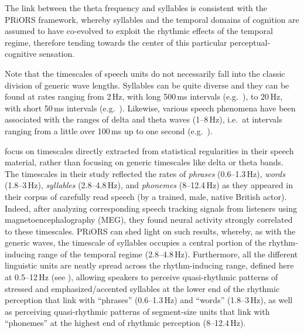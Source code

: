 The link between the theta frequency and syllables is consistent with the PRiORS framework, whereby syllables and the temporal domains of cognition are assumed to have co-evolved to exploit the rhythmic effects of the temporal regime, therefore tending towards the center of this particular perceptual-cognitive sensation.

Note that the timescales of speech units do not necessarily fall into the classic division of generic wave lengths. Syllables can be quite diverse and they can be found at rates ranging from 2\,Hz, with long 500\,ms intervals (e.g.~\citealt{chandrasekaran2009natural}), to 20\,Hz, with short 50\,ms intervals (e.g.~\citealt{greenberg2003temporal}).
Likewise, various speech phenomena have been associated with the ranges of delta and theta waves (1--8\,Hz), i.e.~at intervals ranging from a little over 100\,ms up to one second (e.g.~\citealt{ghitza2017acoustic, ghitza2013theta, cummins2012oscillators, goswami2013speech, inbar2020sequencessk, meyer2017linguistic}).

\citet{keitel2018perceptually} focus on timescales directly extracted from statistical regularities in their speech material, rather than focusing on generic timescales like delta or theta bands. The timescales in their study reflected the rates of \emph{phrases} (0.6--1.3\,Hz), \emph{words} (1.8--3\,Hz), \emph{syllables} (2.8--4.8\,Hz), and \emph{phonemes} (8--12.4\,Hz) as they appeared in their corpus of carefully read speech (by a trained, male, native British actor). Indeed, after analyzing corresponding speech tracking signals from listeners using magnetoencephalography (MEG), they found neural activity strongly correlated to these timescales. PRiORS can shed light on such results, whereby, as with the generic waves, the timescale of syllables occupies a central portion of the rhythm-inducing range of the temporal regime (2.8--4.8\,Hz). Furthermore, all the different linguistic units are neatly spread across the rhythm-inducing range, defined here at 0.5--12\,Hz (see ), allowing speakers to perceive quasi-rhythmic patterns of stressed and emphasized/accented syllables at the lower end of the rhythmic perception that \citet{keitel2018perceptually} link with \enquote{phrases} (0.6--1.3\,Hz) and \enquote{words} (1.8--3\,Hz), as well as perceiving quasi-rhythmic patterns of segment-size units that \citet{keitel2018perceptually} link with \enquote{phonemes} at the highest end of rhythmic perception (8--12.4\,Hz).


